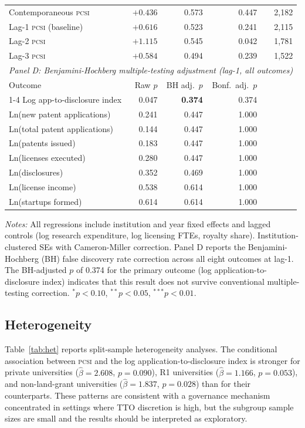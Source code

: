 \documentclass[12pt]{article}
\newcommand{\PCSI}{\textsc{pcsi}}
\begin{document}
\begin{table}[htbp]
\begin{threeparttable}
\begin{tabular}{lrrrrr}
Contemporaneous \PCSI{} & $+0.436$ & 0.573 & 0.447 & & 2,182 \\
Lag-1 \PCSI{} (baseline) & $+0.616$ & 0.523 & 0.241 & & 2,115 \\
Lag-2 \PCSI{} & $+1.115$ & 0.545 & 0.042 & & 1,781 \\
Lag-3 \PCSI{} & $+0.584$ & 0.494 & 0.239 & & 1,522 \\
\midrule
\multicolumn{6}{l}{\textit{Panel D: Benjamini-Hochberg multiple-testing adjustment (lag-1, all outcomes)}} \\
Outcome & Raw $p$ & BH adj.\ $p$ & Bonf.\ adj.\ $p$ & & \\
\cmidrule{1-4}
Log app-to-disclosure index & 0.047 & \textbf{0.374} & 0.374 & & \\
Ln(new patent applications) & 0.241 & 0.447 & 1.000 & & \\
Ln(total patent applications) & 0.144 & 0.447 & 1.000 & & \\
Ln(patents issued) & 0.183 & 0.447 & 1.000 & & \\
Ln(licenses executed) & 0.280 & 0.447 & 1.000 & & \\
Ln(disclosures) & 0.352 & 0.469 & 1.000 & & \\
Ln(license income) & 0.538 & 0.614 & 1.000 & & \\
Ln(startups formed) & 0.614 & 0.614 & 1.000 & & \\
\bottomrule
\end{tabular}
\begin{tablenotes}
\small
\item \textit{Notes:} All regressions include institution and year fixed effects and
lagged controls (log research expenditure, log licensing FTEs, royalty share).
Institution-clustered SEs with Cameron-Miller correction. Panel D reports the
Benjamini-Hochberg (BH) false discovery rate correction across all eight outcomes at
lag-1. The BH-adjusted $p$ of 0.374 for the primary outcome (log application-to-disclosure
index) indicates that this result does not survive conventional multiple-testing
correction. $^*p<0.10$, $^{**}p<0.05$, $^{***}p<0.01$.
\end{tablenotes}
\end{threeparttable}
\end{table}

\subsection{Heterogeneity}

Table~\ref{tab:het} reports split-sample heterogeneity analyses. The conditional
association between \PCSI{} and the log application-to-disclosure index is stronger
for private universities ($\hat\beta=2.608$, $p=0.090$), R1 universities
($\hat\beta=1.166$, $p=0.053$), and non-land-grant universities
($\hat\beta=1.837$, $p=0.028$) than for their counterparts. These patterns are
consistent with a governance mechanism concentrated in settings where TTO discretion
is high, but the subgroup sample sizes are small and the results should be interpreted
as exploratory.
\end{document}
